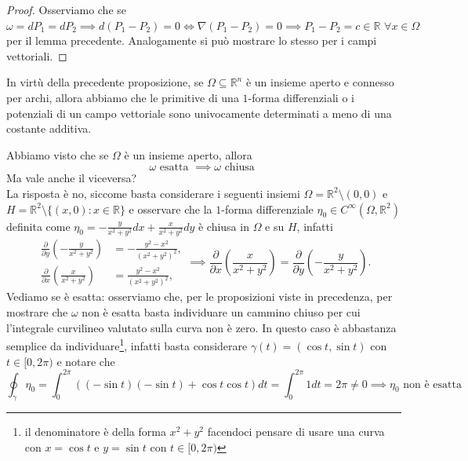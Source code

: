\begin{proof}
Osserviamo che se $\omega = dP_1 = dP_2 \implies d(P_1 - P_2) = 0 \iff \nabla (P_1 - P_2) = 0 \implies P_1 - P_2 = c \in \mathbb{R} \, \, \forall x \in \Omega$ per il lemma precedente. Analogamente si può mostrare lo stesso per i campi vettoriali.
\end{proof}
\begin{remark}
In virtù della precedente proposizione, se $\Omega \subseteq \mathbb{R}^n$ è un insieme aperto e connesso per archi, allora abbiamo che le primitive di una $1$-forma differenziali o i potenziali di un campo vettoriale sono univocamente determinati
a meno di una costante additiva.
\end{remark}
\begin{remark}
Abbiamo visto che se $\Omega$ è un insieme aperto, allora
$$
\omega \text{ esatta } \implies \omega \text{ chiusa }
$$
Ma vale anche il viceversa? \\
La risposta è no, siccome basta considerare i seguenti insiemi $\Omega = \mathbb{R}^2 \setminus {(0, 0)}$ e $H = \mathbb{R}^2 \setminus \{(x, 0) : x \in \mathbb{R} \}$ e osservare che
la $1$-forma differenziale $\eta_0 \in C^\infty(\Omega, \mathbb{R}^2)$ definita come $\eta_0 = - \frac{y}{x^2 + y^2}dx + \frac{x}{x^2+y^2}dy$ è chiusa in $\Omega$ e su $H$, infatti
\begin{equation*}
	\begin{aligned}
		\frac{\partial}{\partial y} \left(- \frac{y}{x^2 + y^2} \right) &= - \frac{y^2 - x^2}{(x^2 + y^2)^2}, \\
		\frac{\partial}{\partial x} \left( \frac{x}{x^2 + y^2} \right) &= \frac{y^2 - x^2}{(x^2 + y^2)^2},
	\end{aligned}
	\implies 
	\frac{\partial}{\partial x} \left( \frac{x}{x^2 + y^2} \right) = \frac{\partial}{\partial y} \left( - \frac{y}{x^2 + y^2} \right).
	\end{equation*}	
Vediamo se è esatta: osserviamo che, per le proposizioni viste in precedenza, per mostrare che $\omega$ non è esatta basta individuare un cammino chiuso per cui l'integrale curvilineo valutato sulla curva non è zero. In questo caso è abbastanza semplice da individuare\footnote{il denominatore
è della forma $x^2 + y^2$ facendoci pensare di usare una curva con $x=\cos{t}$ e $y=\sin{t}$ con $t \in [0, 2 \pi)$}, infatti basta considerare $\gamma(t)=(\cos{t}, \sin{t})$ con $t \in [0, 2 \pi)$ e notare che
$$
\oint_\gamma \eta_0 = \int_0^{2 \pi} ((-\sin{t})(-\sin{t}) + \cos{t}\cos{t})dt = \int_0^{2 \pi} 1 dt = 2 \pi \neq 0 \implies \eta_0 \text{ non è esatta }
$$
\end{remark}
